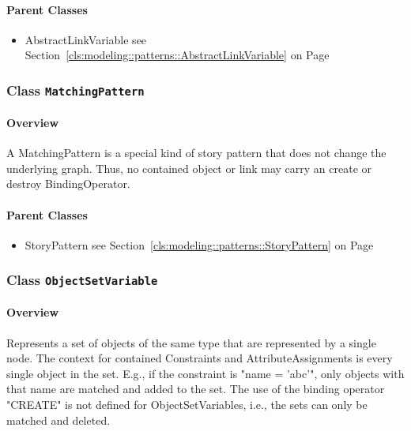 \paragraph{Parent Classes}
\begin{itemize}
\item AbstractLinkVariable see Section~\ref{cls:modeling::patterns::AbstractLinkVariable} on Page~\pageref{cls:modeling::patterns::AbstractLinkVariable}\end{itemize}
\subsubsection{\Large{Class \bfseries \texttt{MatchingPattern}\normalfont}}
\label{cls:modeling::patterns::MatchingPattern} 
\paragraph{Overview}

	
			
A MatchingPattern is a special kind of story pattern that does not change the underlying graph. Thus, no contained object or link may carry an create or destroy BindingOperator.	
		
	



\paragraph{Parent Classes}
\begin{itemize}
\item StoryPattern see Section~\ref{cls:modeling::patterns::StoryPattern} on Page~\pageref{cls:modeling::patterns::StoryPattern}\end{itemize}
\subsubsection{\Large{Class \bfseries \texttt{ObjectSetVariable}\normalfont}}
\label{cls:modeling::patterns::ObjectSetVariable} 
\paragraph{Overview}

	
			
Represents a set of objects of the same type that are represented by a single node.
The context for contained Constraints and AttributeAssignments is every single object in the set. E.g., if the constraint is "name = 'abc'", only objects with that name are matched and added to the set. The use of the binding operator "CREATE" is not defined for ObjectSetVariables, i.e., the sets can only be matched and deleted.	
		
